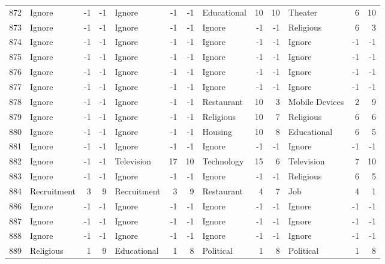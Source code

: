 \begin{figure}[htbp]
\begin{tabular}{rlrrlrrlrrlrr}
    872   & Ignore & -1    & -1    & Ignore & -1    & -1    & Educational & 10    & 10    & Theater & 6     & 10 \\
    873   & Ignore & -1    & -1    & Ignore & -1    & -1    & Ignore & -1    & -1    & Religious & 6     & 3 \\
    874   & Ignore & -1    & -1    & Ignore & -1    & -1    & Ignore & -1    & -1    & Ignore & -1    & -1 \\
    875   & Ignore & -1    & -1    & Ignore & -1    & -1    & Ignore & -1    & -1    & Ignore & -1    & -1 \\
    876   & Ignore & -1    & -1    & Ignore & -1    & -1    & Ignore & -1    & -1    & Ignore & -1    & -1 \\
    877   & Ignore & -1    & -1    & Ignore & -1    & -1    & Ignore & -1    & -1    & Ignore & -1    & -1 \\
    878   & Ignore & -1    & -1    & Ignore & -1    & -1    & Restaurant & 10    & 3     & Mobile Devices & 2     & 9 \\
    879   & Ignore & -1    & -1    & Ignore & -1    & -1    & Religious & 10    & 7     & Religious & 6     & 6 \\
    880   & Ignore & -1    & -1    & Ignore & -1    & -1    & Housing & 10    & 8     & Educational & 6     & 5 \\
    881   & Ignore & -1    & -1    & Ignore & -1    & -1    & Ignore & -1    & -1    & Ignore & -1    & -1 \\
    882   & Ignore & -1    & -1    & Television & 17    & 10    & Technology & 15    & 6     & Television & 7     & 10 \\
    883   & Ignore & -1    & -1    & Ignore & -1    & -1    & Ignore & -1    & -1    & Religious & 6     & 5 \\
    884   & Recruitment & 3     & 9     & Recruitment & 3     & 9     & Restaurant & 4     & 7     & Job   & 4     & 1 \\
    886   & Ignore & -1    & -1    & Ignore & -1    & -1    & Ignore & -1    & -1    & Ignore & -1    & -1 \\
    887   & Ignore & -1    & -1    & Ignore & -1    & -1    & Ignore & -1    & -1    & Ignore & -1    & -1 \\
    888   & Ignore & -1    & -1    & Ignore & -1    & -1    & Ignore & -1    & -1    & Ignore & -1    & -1 \\
    889   & Religious & 1     & 9     & Educational & 1     & 8     & Political & 1     & 8     & Political & 1     & 8 \\

\end{tabular}
\end{figure}
